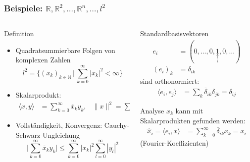%
%
%
\bgroup
\begin{frame}[t]
\setlength{\abovedisplayskip}{5pt}
\setlength{\belowdisplayskip}{5pt}
\frametitle{Beispiele: $\mathbb{R},\mathbb{R}^2,\dots,\mathbb{R}^n,\dots,l^2$}
\vspace{-20pt}
\begin{columns}[t,onlytextwidth]
\begin{column}{0.48\textwidth}
\begin{block}{Definition}
\begin{itemize}
\item Quadratsummierbare Folgen von komplexen Zahlen
\[
l^2
=
\biggl\{
(x_k)_{k\in\mathbb{N}}\,\bigg|\, \sum_{k=0}^\infty |x_k|^2 < \infty
\biggr\}
\]
\item Skalarprodukt:
\begin{align*}
\langle x,y\rangle
&=
\sum_{k=0}^\infty \overline{x}_ky_k,
&
\|x\|^2 = \sum_{k=0}^\infty |x_k|^2
\end{align*}
\item Vollständigkeit,
Konvergenz: Cauchy-Schwarz-Ungleichung
\[
\biggl|
\sum_{k=0}^\infty \overline{x}_ky_k
\biggr|
\le
\sum_{k=0}^\infty |x_k|^2
\sum_{l=0}^\infty |y_l|^2
\]
\end{itemize}
\end{block}
\end{column}
\begin{column}{0.48\textwidth}
\begin{block}{Standardbasisvektoren}
\begin{align*}
e_i
&=
(0,\dots,0,\underset{\underset{\textstyle i}{\textstyle\uparrow}}{1},0,\dots)
\\
(e_i)_k &= \delta_{ik}
\end{align*}
sind orthonormiert:
\begin{align*}
\langle e_i,e_j\rangle
&=
\sum_k \overline{\delta}_{ik}\delta_{jk}
=
\delta_{ij}
\end{align*}
\end{block}
\vspace{-16pt}
\begin{block}{Analyse}
$x_k$ kann mit Skalarprodukten gefunden werden:
\begin{align*}
\hat{x}_i
=
\langle e_i,x\rangle
&=
\sum_{k=0}^\infty \overline{\delta}_{ik}  x_k
=
x_i
\end{align*}
(Fourier-Koeffizienten)
\end{block}
\end{column}
\end{columns}
\end{frame}
\egroup
